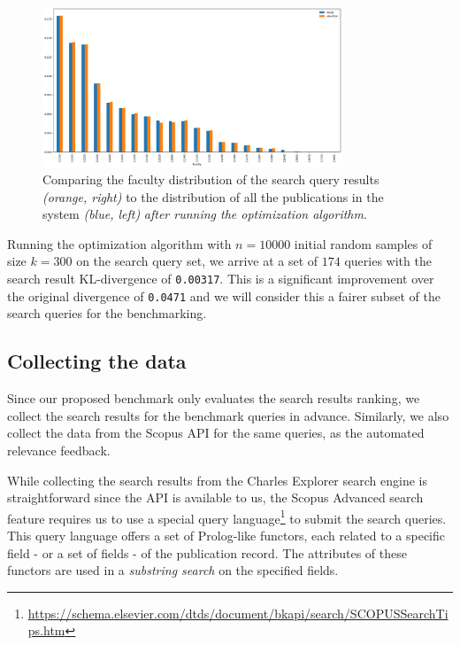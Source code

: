\begin{figure}[ht!]
    \captionsetup{width=.9\linewidth}
    \includegraphics[width=0.8\textwidth]{../img/all-queries-vs-totals-corrected.png}
    \centering
    \caption{Comparing the faculty distribution of the search query results \textit{(orange, right)} to the distribution of all the publications in the system \textit{(blue, left)} \textit{after running the optimization algorithm}.}
\end{figure}

Running the optimization algorithm with $n = 10000$ initial random samples of size $k = 300$ on the search query set, we arrive at a set of $174$ queries with the search result KL-divergence of \texttt{0.00317}. 
This is a significant improvement over the original divergence of \texttt{0.0471} and we will consider this a fairer subset of the search queries for the benchmarking.

\subsection{Collecting the data}

Since our proposed benchmark only evaluates the search results ranking, we collect the search results for the benchmark queries in advance.
Similarly, we also collect the data from the Scopus API for the same queries, as the automated relevance feedback.

While collecting the search results from the Charles Explorer search engine is straightforward since the API is available to us, 
the Scopus Advanced search feature requires us to use a special query language\footnote{\url{https://schema.elsevier.com/dtds/document/bkapi/search/SCOPUSSearchTips.htm}} to submit the search queries. 
This query language offers a set of Prolog-like functors, 
each related to a specific field - or a set of fields - of the publication record. 
The attributes of these functors are used in a \textit{substring search} on the specified fields.


